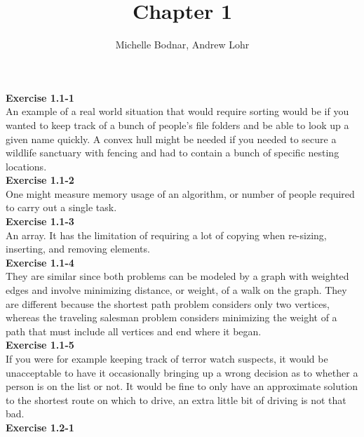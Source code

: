 \documentclass{article}
\title{Chapter 1}
\author{Michelle Bodnar, Andrew Lohr}
\begin{document}
\maketitle

\noindent\textbf{Exercise 1.1-1}\\

An example of a real world situation that would require sorting would be if you wanted to keep track of a bunch of people's file folders and be able to look up a given name quickly. A convex hull might be needed if you needed to secure a wildlife sanctuary with fencing and had to contain a bunch of specific nesting locations.\\



\noindent\textbf{Exercise 1.1-2}\\

One might measure memory usage of an algorithm, or number of people required to carry out a single task.\\


\noindent\textbf{Exercise 1.1-3} \\

An array. It has the limitation of requiring a lot of copying when re-sizing, inserting, and removing elements. \\

\noindent\textbf{Exercise 1.1-4} \\

They are similar since both problems can be modeled by a graph with weighted edges and involve minimizing distance, or weight, of a walk on the graph.  They are different because the shortest path problem considers only two vertices, whereas the traveling salesman problem considers minimizing the weight of a path that must include all vertices and end where it began. \\

\noindent\textbf{Exercise 1.1-5} \\

If you were for example keeping track of terror watch suspects, it would be unacceptable to have it occasionally bringing up a wrong decision as to whether a person is on the list or not. It would be fine to only have an approximate solution to the shortest route on which to drive, an extra little bit of driving is not that bad. \\

\noindent\textbf{Exercise 1.2-1} \\
\end{document}
